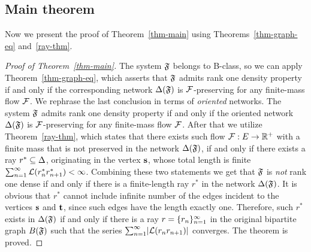 \documentclass[12pt,oneside,a4paper]{amsart}
\begin{document}
      \subsection{Main theorem}
        Now we present the proof of Theorem~\ref{thm-main} using Theorems~\ref{thm-graph-eq} and~\ref{ray-thm}.
        \begin{proof}[Proof of Theorem~\ref{thm-main}]
          The system $\mathfrak{F}$ belongs to B-class, so we can apply Theorem~\ref{thm-graph-eq}, which asserts
            that $\mathfrak{F}$ admits rank one density property if and only if
            the corresponding network $\Delta(\mathfrak{F})$ is $\mathcal{F}$-preserving for any
            finite-mass flow $\mathcal{F}$.
          We rephrase the last conclusion in terms of \emph{oriented} networks.
          The system $\mathfrak{F}$ admits rank one density property if and only if
            the oriented network $\Delta(\mathfrak{F})$ is $\mathcal{F}$-preserving for any
            finite-mass flow $\mathcal{F}$.
          After that we utilize Theorem~\ref{ray-thm}, which states that there exists such
            flow $\mathcal{F}: E \to \mathbb{R}^{+}$ with a finite mass that is not preserved in
            the network $\Delta(\mathfrak{F})$, if and only if there exists a ray $r^{*} \subseteq \Delta$, originating in the vertex $\mathbf{s}$,
            whose total length is finite $\sum_{n=1}^\infty \mathcal{L}(r^{*}_n r^{*}_{n+1}) < \infty$.
          Combining these two statements we get that $\mathfrak{F}$ is \emph{not} rank one dense if and only if
            there is a finite-length ray $r^*$ in the network $\Delta(\mathfrak{F})$.
          It is obvious that $r^*$ cannot include infinite number of the edges incident to the vertices
            $\mathbf{s}$ and $\mathbf{t}$, since such edges have the length exactly one.
          Therefore, such $r^*$ exists in $\Delta(\mathfrak{F})$ if and only if there is a ray $r=\{{r}_n\}_{n=1}^\infty$ in the original bipartite graph $B(\mathfrak{F})$ such that
            the series $\sum_{n=1}^\infty\lvert\mathcal{L}(r_n r_{n+1})\rvert$ converges.
          The theorem is proved.
        \end{proof}
\end{document}
